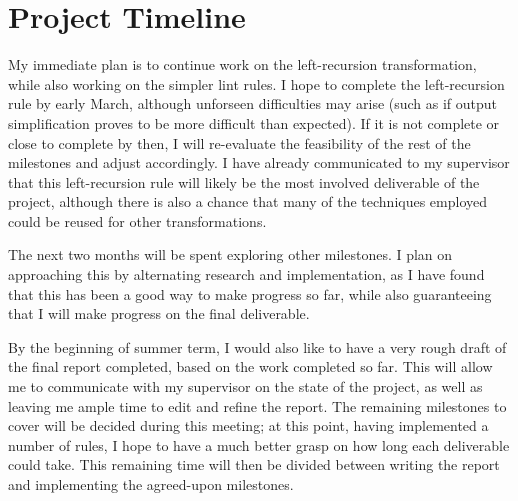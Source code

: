 \section{Project Timeline}

My immediate plan is to continue work on the left-recursion transformation, while also working on the simpler lint rules.
I hope to complete the left-recursion rule by early March, although unforseen difficulties may arise (such as if output simplification proves to be more difficult than expected).
If it is not complete or close to complete by then, I will re-evaluate the feasibility of the rest of the milestones and adjust accordingly.
I have already communicated to my supervisor that this left-recursion rule will likely be the most involved deliverable of the project, although there is also a chance that many of the techniques employed could be reused for other transformations.

The next two months will be spent exploring other milestones.
I plan on approaching this by alternating research and implementation, as I have found that this has been a good way to make progress so far, while also guaranteeing that I will make progress on the final deliverable.

By the beginning of summer term, I would also like to have a very rough draft of the final report completed, based on the work completed so far.
This will allow me to communicate with my supervisor on the state of the project, as well as leaving me ample time to edit and refine the report.
The remaining milestones to cover will be decided during this meeting; at this point, having implemented a number of rules, I hope to have a much better grasp on how long each deliverable could take.
This remaining time will then be divided between writing the report and implementing the agreed-upon milestones.
